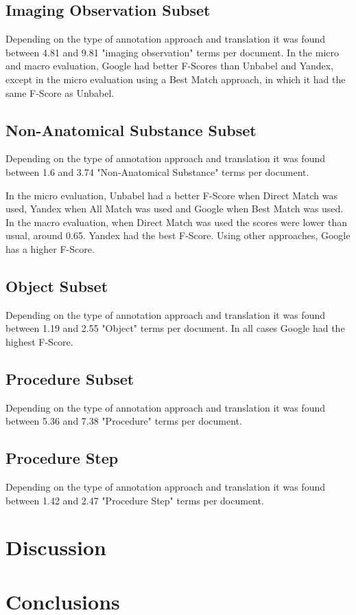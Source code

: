 \subsection{Imaging Observation Subset}

Depending on the type of annotation approach and translation it was found between 4.81 and 9.81 "imaging observation" terms per document. In the micro and macro evaluation, Google had better F-Scores than Unbabel and Yandex, except in the micro evaluation using a Best Match approach, in which it had the same F-Score as Unbabel.

\subsection{Non-Anatomical Substance Subset}

Depending on the type of annotation approach and translation it was found between 1.6 and 3.74 "Non-Anatomical Substance" terms per document. 

In the micro evaluation, Unbabel had a better F-Score when Direct Match was used, Yandex when All Match was used and Google when Best Match was used. In the macro evaluation, when Direct Match was used the scores were lower than usual, around 0.65. Yandex had the best F-Score. Using other approaches, Google has a higher F-Score.

\subsection{Object Subset}

Depending on the type of annotation approach and translation it was found between 1.19 and 2.55 "Object" terms per document. In all cases Google had the highest F-Score.

\subsection{Procedure Subset}

Depending on the type of annotation approach and translation it was found between 5.36 and 7.38 "Procedure" terms per document.

\subsection{Procedure Step}

Depending on the type of annotation approach and translation it was found between 1.42 and 2.47 "Procedure Step" terms per document.



\section{Discussion}





\section{Conclusions}




  

